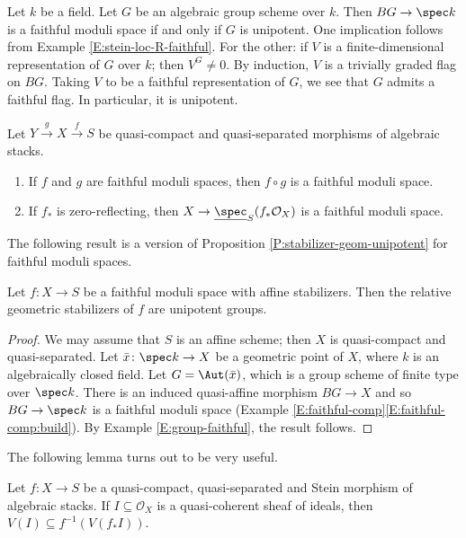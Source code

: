 \documentclass[reqno,a4paper]{amsart}
\numberwithin{Theorem}{section}
\newcommand{\Orb}{\mathcal{O}}
\theoremstyle{plain}
\theoremstyle{remark}
\newcommand{\classB}{B}
\begin{document}
\begin{Example}\label{E:group-faithful}
  Let $k$ be a field. Let $G$ be an algebraic group scheme over
  $k$. Then $\classB G \to \spec k$ is a faithful moduli space if and
  only if $G$ is unipotent. One implication follows from Example
  \ref{E:stein-loc-R-faithful}. For the other: if $V$ is a
  finite-dimensional representation of $G$ over $k$; then
  $V^G \neq 0$. By induction, $V$ is a trivially graded flag on
  $\classB G$. Taking $V$ to be a faithful representation of $G$, we
  see that $G$ admits a faithful flag. In particular, it is unipotent.
\end{Example}
\begin{Example}\label{E:faithful-comp}
  Let $Y \xrightarrow{g} X \xrightarrow{f} S$ be quasi-compact and
  quasi-separated morphisms of algebraic stacks.
  \begin{enumerate}
  \item\label{E:faithful-comp:comp} If $f$ and $g$ are faithful moduli spaces, then $f\circ g$ is
    a faithful moduli space.
  \item\label{E:faithful-comp:build} If
    $f_*$ is zero-reflecting, then $X \to \underline{\spec}_S(f_*\Orb_X)$ is a
    faithful moduli space.
  \end{enumerate}
\end{Example}
The following result is a version of Proposition
\ref{P:stabilizer-geom-unipotent} for faithful moduli spaces.
\begin{proposition}\label{P:res-gerb-faithful}
  Let $f \colon X \to S$ be a faithful moduli space with affine stabilizers. Then the relative
  geometric stabilizers of $f$ are unipotent groups. 
\end{proposition}
\begin{proof}
  We may assume that $S$ is an affine scheme; then $X$ is
  quasi-compact and quasi-separated. Let
  $\bar{x} \colon \spec k \to X$ be a geometric point of $X$, where
  $k$ is an algebraically closed field. Let $G= \Aut(\bar{x})$, which
  is a group scheme of finite type over $\spec k$. There is an
  induced quasi-affine morphism $\classB G \to X$
  \cite[Thm.~B.2]{MR2774654} and so $\classB G \to \spec k$ is a
  faithful moduli space (Example
  \ref{E:faithful-comp}\eqref{E:faithful-comp:build}). By Example
  \ref{E:group-faithful}, the result follows.
\end{proof}
The following lemma turns out to be very useful.
\begin{lemma}\label{L:disjoint-local}
  Let $f \colon X \to S$ be a quasi-compact, quasi-separated and Stein
  morphism of algebraic stacks. If $I \subseteq \Orb_X$ is a
  quasi-coherent sheaf of ideals, then
  $V(I) \subseteq f^{-1}(V(f_*I))$. 
\end{lemma}
\end{document}
